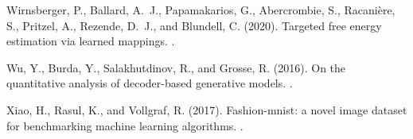 \documentclass{article}
\newcommand{\1}{\mathds{1}}
\begin{document}
\begin{thebibliography}{50}
Wirnsberger, P., Ballard, A.~J., Papamakarios, G., Abercrombie, S.,
  Racani{\`e}re, S., Pritzel, A., Rezende, D.~J., and Blundell, C. (2020).
\newblock Targeted free energy estimation via learned mappings.
.

Wu, Y., Burda, Y., Salakhutdinov, R., and Grosse, R. (2016).
\newblock On the quantitative analysis of decoder-based generative models.
.

Xiao, H., Rasul, K., and Vollgraf, R. (2017).
\newblock Fashion-mnist: a novel image dataset for benchmarking machine
  learning algorithms.
.

\end{thebibliography}
\end{document}
